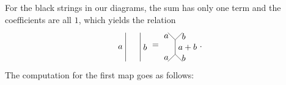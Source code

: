 For the black strings in our diagrams, the sum has only one term and the coefficients are all $1$, which yields the relation
	\begin{equation}
		\begin{tikzpicture}[scale=1.2,baseline=(current bounding box.center)]
			\draw (0,0) to node [left] {$a$} (0,1);
			\draw (0.5,0) to node [right] {$b$} (0.5,1);
		\end{tikzpicture}=
		\begin{tikzpicture}[scale=1.2,baseline=(current bounding box.center)]
			\draw (0,0) to node [left] {$a$} (0.25,0.25);
			\draw (0.5,0) to node [right] {$b$} (0.25,0.25);
			\draw (0,1) to node [left] {$a$} (0.25,0.75);
			\draw (0.5,1) to node [right] {$b$} (0.25,0.75);
			\draw (0.25,0.25) to node [right] {$a+b$} (0.25,0.75);
		\end{tikzpicture}.
	\end{equation}
The computation for the first map goes as follows:
